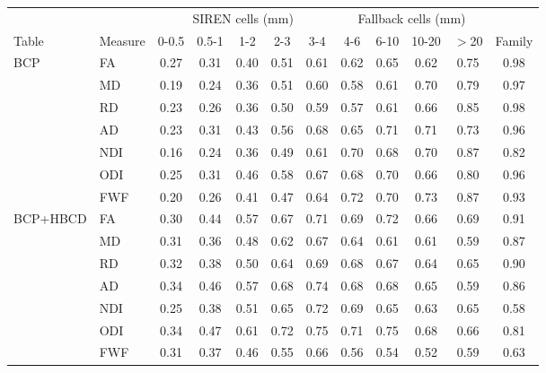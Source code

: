 \begin{tabular}{llcccccccccc}
\toprule
 & & \multicolumn{5}{c}{SIREN cells (mm)} & \multicolumn{4}{c}{Fallback cells (mm)} & \\
\cmidrule(lr){3-7}\cmidrule(lr){8-11}
Table & Measure & 0-0.5 & 0.5-1 & 1-2 & 2-3 & 3-4 & 4-6 & 6-10 & 10-20 & $>$20 & Family \\
\midrule
BCP & FA & 0.27 & 0.31 & 0.40 & 0.51 & 0.61 & 0.62 & 0.65 & 0.62 & 0.75 & 0.98 \\
 & MD & 0.19 & 0.24 & 0.36 & 0.51 & 0.60 & 0.58 & 0.61 & 0.70 & 0.79 & 0.97 \\
 & RD & 0.23 & 0.26 & 0.36 & 0.50 & 0.59 & 0.57 & 0.61 & 0.66 & 0.85 & 0.98 \\
 & AD & 0.23 & 0.31 & 0.43 & 0.56 & 0.68 & 0.65 & 0.71 & 0.71 & 0.73 & 0.96 \\
 & NDI & 0.16 & 0.24 & 0.36 & 0.49 & 0.61 & 0.70 & 0.68 & 0.70 & 0.87 & 0.82 \\
 & ODI & 0.25 & 0.31 & 0.46 & 0.58 & 0.67 & 0.68 & 0.70 & 0.66 & 0.80 & 0.96 \\
 & FWF & 0.20 & 0.26 & 0.41 & 0.47 & 0.64 & 0.72 & 0.70 & 0.73 & 0.87 & 0.93 \\
\addlinespace[2pt]
BCP+HBCD & FA & 0.30 & 0.44 & 0.57 & 0.67 & 0.71 & 0.69 & 0.72 & 0.66 & 0.69 & 0.91 \\
 & MD & 0.31 & 0.36 & 0.48 & 0.62 & 0.67 & 0.64 & 0.61 & 0.61 & 0.59 & 0.87 \\
 & RD & 0.32 & 0.38 & 0.50 & 0.64 & 0.69 & 0.68 & 0.67 & 0.64 & 0.65 & 0.90 \\
 & AD & 0.34 & 0.46 & 0.57 & 0.68 & 0.74 & 0.68 & 0.68 & 0.65 & 0.59 & 0.86 \\
 & NDI & 0.25 & 0.38 & 0.51 & 0.65 & 0.72 & 0.69 & 0.65 & 0.63 & 0.65 & 0.58 \\
 & ODI & 0.34 & 0.47 & 0.61 & 0.72 & 0.75 & 0.71 & 0.75 & 0.68 & 0.66 & 0.81 \\
 & FWF & 0.31 & 0.37 & 0.46 & 0.55 & 0.66 & 0.56 & 0.54 & 0.52 & 0.59 & 0.63 \\
\bottomrule
\end{tabular}
